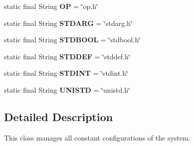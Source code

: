 \begin{DoxyCompactItemize}
\item 
\hypertarget{classedu_1_1udel_1_1cis_1_1vsl_1_1civl_1_1config_1_1IF_1_1CIVLConstants_ae6085d0ee0b9c306604924fa9a7cab51}{}static final String {\bfseries O\+P} = \char`\"{}op.\+h\char`\"{}\label{classedu_1_1udel_1_1cis_1_1vsl_1_1civl_1_1config_1_1IF_1_1CIVLConstants_ae6085d0ee0b9c306604924fa9a7cab51}

\item 
\hypertarget{classedu_1_1udel_1_1cis_1_1vsl_1_1civl_1_1config_1_1IF_1_1CIVLConstants_a3bd059e5619b6d304225b828bd8dbc2e}{}static final String {\bfseries S\+T\+D\+A\+R\+G} = \char`\"{}stdarg.\+h\char`\"{}\label{classedu_1_1udel_1_1cis_1_1vsl_1_1civl_1_1config_1_1IF_1_1CIVLConstants_a3bd059e5619b6d304225b828bd8dbc2e}

\item 
\hypertarget{classedu_1_1udel_1_1cis_1_1vsl_1_1civl_1_1config_1_1IF_1_1CIVLConstants_a9a709ec653adf3ad59e5b8adbbe8cf7e}{}static final String {\bfseries S\+T\+D\+B\+O\+O\+L} = \char`\"{}stdbool.\+h\char`\"{}\label{classedu_1_1udel_1_1cis_1_1vsl_1_1civl_1_1config_1_1IF_1_1CIVLConstants_a9a709ec653adf3ad59e5b8adbbe8cf7e}

\item 
\hypertarget{classedu_1_1udel_1_1cis_1_1vsl_1_1civl_1_1config_1_1IF_1_1CIVLConstants_a15b2cb163cf9888ebdd3280b29952f21}{}static final String {\bfseries S\+T\+D\+D\+E\+F} = \char`\"{}stddef.\+h\char`\"{}\label{classedu_1_1udel_1_1cis_1_1vsl_1_1civl_1_1config_1_1IF_1_1CIVLConstants_a15b2cb163cf9888ebdd3280b29952f21}

\item 
\hypertarget{classedu_1_1udel_1_1cis_1_1vsl_1_1civl_1_1config_1_1IF_1_1CIVLConstants_ab5561b9cbc655c67b88775433cd4b442}{}static final String {\bfseries S\+T\+D\+I\+N\+T} = \char`\"{}stdint.\+h\char`\"{}\label{classedu_1_1udel_1_1cis_1_1vsl_1_1civl_1_1config_1_1IF_1_1CIVLConstants_ab5561b9cbc655c67b88775433cd4b442}

\item 
\hypertarget{classedu_1_1udel_1_1cis_1_1vsl_1_1civl_1_1config_1_1IF_1_1CIVLConstants_a87b7c8d851beb5d8c4d1a65f4dc91e25}{}static final String {\bfseries U\+N\+I\+S\+T\+D} = \char`\"{}unistd.\+h\char`\"{}\label{classedu_1_1udel_1_1cis_1_1vsl_1_1civl_1_1config_1_1IF_1_1CIVLConstants_a87b7c8d851beb5d8c4d1a65f4dc91e25}

\end{DoxyCompactItemize}


\subsection{Detailed Description}
This class manages all constant configurations of the system. 

